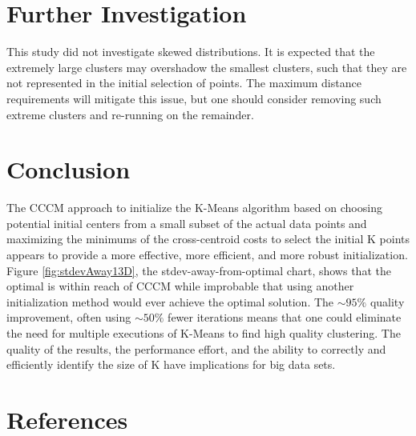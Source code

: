 \documentclass{article}
\begin{document}
\section{Further Investigation}

This study did not investigate skewed distributions.  It is expected that the extremely large clusters may overshadow the smallest clusters, such that they are not represented in the initial selection of points.  The maximum distance requirements will mitigate this issue, but one should consider removing such extreme clusters and re-running on the remainder.

\section{Conclusion}

The CCCM approach to initialize the K-Means algorithm based on choosing potential initial centers from a small subset of the actual data points and maximizing the minimums of the cross-centroid costs to select the initial K points appears to provide a more effective, more efficient, and more robust initialization.
Figure \ref{fig:stdevAway13D}, the stdev-away-from-optimal chart, shows that the optimal is within reach of CCCM while improbable that using another initialization method would ever achieve the optimal solution.
The $\sim$$95\%$ quality improvement, often using $\sim$$50\%$ fewer iterations means that one could eliminate the need for multiple executions of K-Means to find high quality clustering.  The quality of the results, the performance effort, and the ability to correctly and efficiently identify the size of K have implications for big data sets.

\section*{References}
\end{document}
